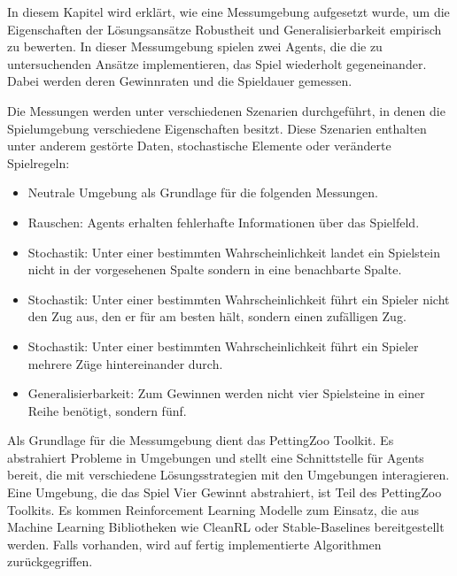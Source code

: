 In diesem Kapitel wird erklärt, wie eine Messumgebung aufgesetzt wurde, um die Eigenschaften der Lösungsansätze Robustheit und Generalisierbarkeit empirisch zu bewerten. In dieser Messumgebung spielen zwei Agents, die die zu untersuchenden Ansätze implementieren, das Spiel wiederholt gegeneinander. Dabei werden deren Gewinnraten und die Spieldauer gemessen.

Die Messungen werden unter verschiedenen Szenarien durchgeführt, in denen die Spielumgebung verschiedene Eigenschaften besitzt. Diese Szenarien enthalten unter anderem gestörte Daten, stochastische Elemente oder veränderte Spielregeln:

\begin{itemize}
	\item Neutrale Umgebung als Grundlage für die folgenden Messungen.
	\item Rauschen: Agents erhalten fehlerhafte Informationen über das Spielfeld.
	\item Stochastik: Unter einer bestimmten Wahrscheinlichkeit landet ein Spielstein nicht in der vorgesehenen Spalte sondern in eine benachbarte Spalte.
	\item Stochastik: Unter einer bestimmten Wahrscheinlichkeit führt ein Spieler nicht den Zug aus, den er für am besten hält, sondern einen zufälligen Zug.
	\item Stochastik: Unter einer bestimmten Wahrscheinlichkeit führt ein Spieler mehrere Züge hintereinander durch.
	\item Generalisierbarkeit: Zum Gewinnen werden nicht vier Spielsteine in einer Reihe benötigt, sondern fünf.
\end{itemize}

Als Grundlage für die Messumgebung dient das PettingZoo Toolkit. Es abstrahiert Probleme in Umgebungen und stellt eine Schnittstelle für Agents bereit, die mit verschiedene Lösungsstrategien mit den Umgebungen interagieren. Eine Umgebung, die das Spiel Vier Gewinnt abstrahiert, ist Teil des PettingZoo Toolkits. Es kommen Reinforcement Learning Modelle zum Einsatz, die aus Machine Learning Bibliotheken wie CleanRL oder Stable-Baselines bereitgestellt werden. Falls vorhanden, wird auf fertig implementierte Algorithmen zurückgegriffen.